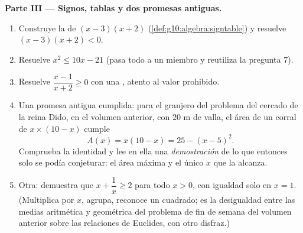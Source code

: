 \begin{problem}[{Problema de fin de semana --- problemas de suma y
producto, completar el cuadrado tal como lo dibujaba al-Juarismi y la
ecuación $x^2 = x + 1$}]
\medskip
\noindent\textbf{Parte III --- Signos, tablas y dos promesas
antiguas.}
\begin{enumerate}[resume]
  \item Construye la  de $(x - 3)(x + 2)$
        (\cref{def:g10:algebra:signtable}) y resuelve
        $(x - 3)(x + 2) < 0$.
  \item Resuelve $x^2 \leq 10x - 21$ (pasa todo a un miembro y reutiliza
        la pregunta 7).
  \item Resuelve $\dfrac{x - 1}{x + 2} \geq 0$ con una ,
        atento al valor prohibido.
  \item Una promesa antigua cumplida: para el granjero del problema del
        cercado de la reina Dido, en el volumen anterior, con $20$ m de
        valla, el área de un corral de $x \times (10 - x)$ cumple
        \[
        A(x) = x(10 - x) = 25 - (x - 5)^2 .
        \]
        Comprueba la identidad y lee en ella una \emph{demostración} de lo
        que entonces solo se podía conjeturar: el área máxima y el único
        $x$ que la alcanza.
  \item Otra: demuestra que $x + \dfrac1x \geq 2$ para todo $x > 0$, con
        igualdad solo en $x = 1$. (Multiplica por $x$, agrupa, reconoce un
        cuadrado; es la desigualdad entre las medias aritmética y
        geométrica del problema de fin de semana del volumen anterior
        sobre las relaciones de Euclides, con otro disfraz.)
\end{enumerate}


\end{problem}
